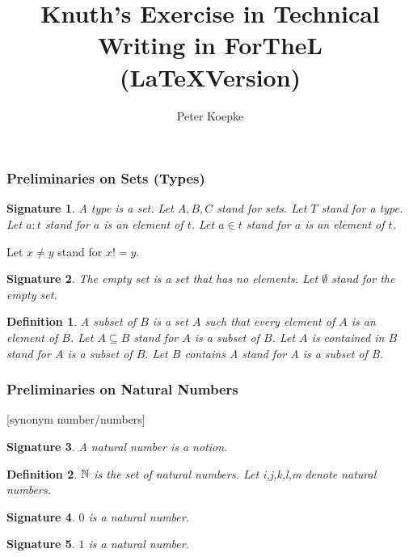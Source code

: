 \documentclass[12pt]{article}
\title{Knuth's Exercise in Technical Writing in ForTheL (\LaTeX Version)}
\author{Peter Koepke}
\newtheorem{signature}{Signature}
\newtheorem{definition}{Definition}
\newcommand{\NN}{{\Bbb N}}
\begin{document}
\maketitle

\subsubsection*{Preliminaries on Sets (Types)}

\begin{signature} A \emph{type} is a set.
Let $A,B,C$ stand for sets.
Let $T$ stand for a type.
Let $a : t$ stand for $a$ is an element of $t$.
Let $a \in t$ stand for $a$ is an element of $t$.
\end{signature}

Let $x \neq y$ stand for $x != y$.

\begin{signature} The \emph{empty set} is a set that has 
no elements. Let $\emptyset$ stand for the empty set.
\end{signature}

\begin{definition} A \emph{subset of} $B$ is a set $A$ such
that every element of $A$ is an element of $B$. 
Let $A \subseteq B$ stand for $A$ is a subset of $B$.
Let $A$ \emph{is contained in} $B$ stand for $A$ is a subset of $B$.
Let $B$ \emph{contains} A stand for A is a subset of B.
\end{definition}

\subsubsection*{Preliminaries on Natural Numbers}

[synonym number/numbers]
\begin{signature} A \emph{natural number} is a notion.
\end{signature}

\begin{definition} $\NN$ is the set of natural numbers.
Let i,j,k,l,m denote natural numbers.
\end{definition}

\begin{signature} $0$ is a natural number.
\end{signature}

\begin{signature} $1$ is a natural number.
\end{signature}
\end{document}
